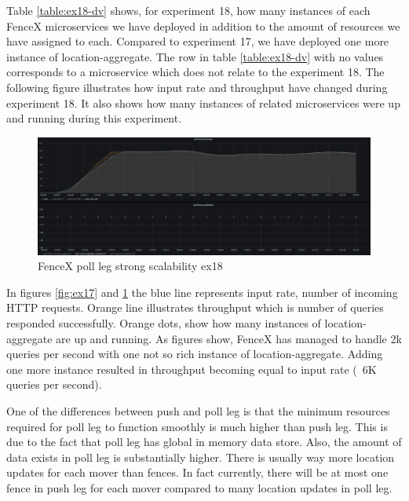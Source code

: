 \documentclass[a4]{report}
\begin{document}
    Table \ref{table:ex18-dv} shows, for experiment 18, how many instances of each FenceX microservices we have
    deployed in addition to the amount of resources we have assigned to each.
    Compared to experiment 17, we have deployed one more instance of location-aggregate.
    The row in table \ref{table:ex18-dv} with no values corresponds to a microservice which does not relate to the
    experiment 18.
    The following figure illustrates how input rate and throughput have changed during experiment 18.
    It also shows how many instances of related microservices were up and running during this experiment.

    \begin{figure}[h!]
        \centering
        \caption{FenceX poll leg strong scalability ex18}
        \label{fig:ex18}
        \includegraphics[width=\linewidth, scale=2]{images/evaluation/ex18-benchmarking-ongoing-2per4sec.png}
    \end{figure}

    In figures \ref{fig:ex17} and \ref{fig:ex18} the blue line represents input rate, number of incoming HTTP
    requests.
    Orange line illustrates throughput which is number of queries responded successfully.
    Orange dots, show how many instances of location-aggregate are up and running.
    As figures show, FenceX has managed to handle 2k queries per second with one not so rich instance of location-aggregate.
    Adding one more instance resulted in throughput becoming equal to input rate (~6K queries per second).

    One of the differences between push and poll leg is that the minimum resources required for poll leg to function
    smoothly is much higher than push leg.
    This is due to the fact that poll leg has global in memory data store.
    Also, the amount of data exists in poll leg is substantially higher.
    There is usually way more location updates for each mover than fences.
    In fact currently, there will be at most one fence in push leg for each mover compared to many location updates
    in poll leg.
\end{document}
